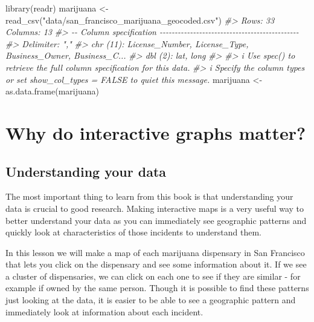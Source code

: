\documentclass[
]{krantz}
\makeatletter
\newenvironment{Shaded}{\begin{snugshade}}{\end{snugshade}}
\newcommand{\CommentTok}[1]{\textcolor[rgb]{0.37,0.37,0.37}{\textit{#1}}}
\newcommand{\FunctionTok}[1]{\textcolor[rgb]{0,0,0}{#1}}
\newcommand{\NormalTok}[1]{#1}
\newcommand{\OtherTok}[1]{\textcolor[rgb]{0.37,0.37,0.37}{#1}}
\newcommand{\StringTok}[1]{\textcolor[rgb]{0.5,0.5,0.5}{#1}}
\newenvironment{kframe}{%
\medskip{}
\setlength{\fboxsep}{.8em}
 \def\at@end@of@kframe{}%
 \ifinner\ifhmode%
  \def\at@end@of@kframe{\end{minipage}}%
  \begin{minipage}{\columnwidth}%
 \fi\fi%
 \def\FrameCommand##1{\hskip\@totalleftmargin \hskip-\fboxsep
 \colorbox{shadecolor}{##1}\hskip-\fboxsep
     \hskip-\linewidth \hskip-\@totalleftmargin \hskip\columnwidth}%
 \MakeFramed {\advance\hsize-\width
   \@totalleftmargin\z@ \linewidth\hsize
   \@setminipage}}%
 {\par\unskip\endMakeFramed%
 \at@end@of@kframe}
\renewenvironment{Shaded}{\begin{kframe}}{\end{kframe}}
\makeatother
\begin{document}
\begin{Shaded}
\begin{Highlighting}[]
\FunctionTok{library}\NormalTok{(readr)}
\NormalTok{marijuana }\OtherTok{\textless{}{-}} \FunctionTok{read\_csv}\NormalTok{(}\StringTok{"data/san\_francisco\_marijuana\_geocoded.csv"}\NormalTok{)}
\CommentTok{\#\textgreater{} Rows: 33 Columns: 13}
\CommentTok{\#\textgreater{} {-}{-} Column specification {-}{-}{-}{-}{-}{-}{-}{-}{-}{-}{-}{-}{-}{-}{-}{-}{-}{-}{-}{-}{-}{-}{-}{-}{-}{-}{-}{-}{-}{-}{-}{-}{-}{-}{-}{-}{-}{-}{-}{-}{-}{-}{-}{-}{-}{-}}
\CommentTok{\#\textgreater{} Delimiter: ","}
\CommentTok{\#\textgreater{} chr (11): License\_Number, License\_Type, Business\_Owner, Business\_C...}
\CommentTok{\#\textgreater{} dbl  (2): lat, long}
\CommentTok{\#\textgreater{} }
\CommentTok{\#\textgreater{} i Use \textasciigrave{}spec()\textasciigrave{} to retrieve the full column specification for this data.}
\CommentTok{\#\textgreater{} i Specify the column types or set \textasciigrave{}show\_col\_types = FALSE\textasciigrave{} to quiet this message.}
\NormalTok{marijuana }\OtherTok{\textless{}{-}} \FunctionTok{as.data.frame}\NormalTok{(marijuana)}
\end{Highlighting}
\end{Shaded}

\hypertarget{why-do-interactive-graphs-matter}{%
\section{Why do interactive graphs matter?}\label{why-do-interactive-graphs-matter}}

\hypertarget{understanding-your-data}{%
\subsection{Understanding your data}\label{understanding-your-data}}

The most important thing to learn from this book is that understanding your data is crucial to good research. Making interactive maps is a very useful way to better understand your data as you can immediately see geographic patterns and quickly look at characteristics of those incidents to understand them.

In this lesson we will make a map of each marijuana dispensary in San Francisco that lets you click on the dispensary and see some information about it. If we see a cluster of dispensaries, we can click on each one to see if they are similar - for example if owned by the same person. Though it is possible to find these patterns just looking at the data, it is easier to be able to see a geographic pattern and immediately look at information about each incident.
\end{document}
